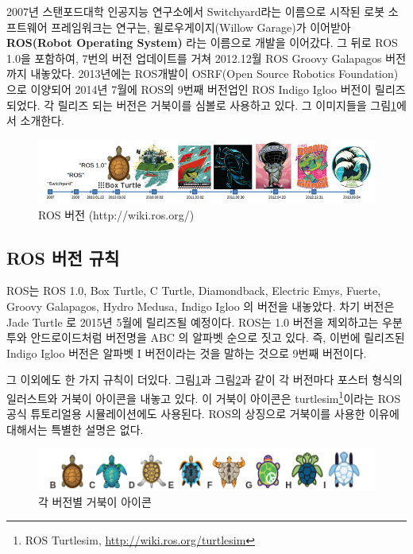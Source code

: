 2007년 스탠포드대학 인공지능 연구소에서 Switchyard라는 이름으로 시작된 로봇 소프트웨어 프레임워크는 연구는, 윌로우게이지(Willow Garage)가 이어받아 \textbf{ROS(Robot Operating System)} 라는 이름으로 개발을 이어갔다. 그 뒤로 ROS 1.0을 포함하여, 7번의 버전 업데이트를 거쳐 2012.12월 ROS Groovy Galapagos 버전까지 내놓았다. 2013년에는 ROS개발이 OSRF(Open Source Robotics Foundation)으로 이양되어 2014년 7월에 ROS의 9번째 버전업인 ROS Indigo Igloo 버전이 릴리즈되었다. 각 릴리즈 되는 버전은 거북이를 심볼로 사용하고 있다. 그 이미지들을 그림\ref{fig:rosversion}에서 소개한다.

\begin{figure}[h]
\centering\includegraphics[width=\columnwidth]{pictures/chapter1/2013rosversion.png}
\caption{ROS 버전 (http://wiki.ros.org/)}
\label{fig:rosversion}
\end{figure}

\subsection{ROS 버전 규칙}

ROS는 ROS 1.0, Box Turtle, C Turtle, Diamondback, Electric Emys, Fuerte, Groovy Galapagos, Hydro Medusa, Indigo Igloo 의 버전을 내놓았다. 차기 버전은 Jade Turtle 로 2015년 5월에 릴리즈될 예정이다. ROS는 1.0 버전을 제외하고는 우분투와 안드로이드처럼 버전명을 ABC 의 알파벳 순으로 짓고 있다. 즉, 이번에 릴리즈된 Indigo Igloo 버전은 알파벳 I 버전이라는 것을 말하는 것으로 9번째 버전이다.

그 이외에도 한 가지 규칙이 더있다. 그림\ref{fig:rosversion}과 그림\ref{fig:ros_turtle_icon}과 같이 각 버전마다 포스터 형식의 일러스트와 거북이 아이콘을 내놓고 있다. 이 거북이 아이콘은 turtlesim\footnote{ROS Turtlesim, \url{http://wiki.ros.org/turtlesim}}이라는 ROS 공식 튜토리얼용 시뮬레이션에도 사용된다. ROS의 상징으로 거북이를 사용한 이유에 대해서는 특별한 설명은 없다.

\begin{figure}[h]
\centering\includegraphics[width=\columnwidth]{pictures/chapter1/ros_turtle_icon.png}
\caption{각 버전별 거북이 아이콘}
\label{fig:ros_turtle_icon}
\end{figure}

